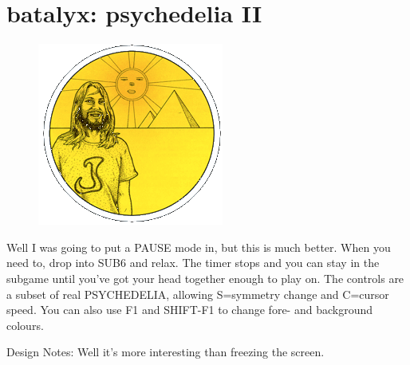\chapter{batalyx: psychedelia II} 
\label{sec:patterns}
\rhead[]{\leftmark}
\lstset{style=6502Style}
\lstset{ 
   aboveskip=5pt,
   belowskip=0pt,
}

\begin{definition}
\setlength{\intextsep}{0pt}%
\setlength{\columnsep}{3pt}%
\begin{figure}
\includegraphics[width=\linewidth]{src/callout/psych.png} 
\end{figure}
\small
Well I was going to put a PAUSE mode in, but this is much better. When you need to, drop into SUB6 and relax. The timer stops and you can stay in the subgame until you've got your head together enough to play on. The controls are a subset of real PSYCHEDELIA, allowing S=symmetry change and C=cursor speed. You can also use F1 and SHIFT-F1 to change fore- and background colours.

Design Notes: Well it's more interesting than freezing the screen.
\end{definition}


